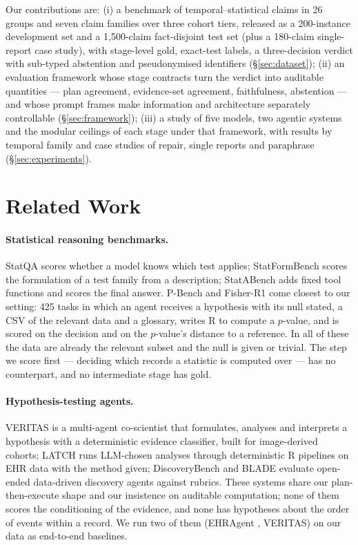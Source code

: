 Our contributions are: (i) a benchmark of temporal--statistical claims in 26
groups and seven claim families over three cohort tiers, released as a
200-instance development set and a 1{,}500-claim fact-disjoint test set (plus
a 180-claim single-report case study), with stage-level gold, exact-test
labels, a three-decision verdict with sub-typed abstention and pseudonymised
identifiers (\S\ref{sec:dataset}); (ii) an evaluation framework whose stage
contracts turn the verdict into auditable quantities --- plan agreement,
evidence-set agreement, faithfulness, abstention --- and whose prompt frames
make information and architecture separately controllable
(\S\ref{sec:framework}); (iii) a study of five models, two agentic systems and
the modular ceilings of each stage under that framework, with results by
temporal family and case studies of repair, single reports and paraphrase
(\S\ref{sec:experiments}).

\section{Related Work}
\label{sec:related}

\paragraph{Statistical reasoning benchmarks.} StatQA \cite{zhu2024statqa}
scores whether a model knows which test applies; StatFormBench
\cite{wang2026statformbench} scores the formulation of a test family from a
description; StatABench \cite{zhu2026statabench} adds fixed tool functions and
scores the final answer. P-Bench and Fisher-R1 \cite{miao2026fisher} come
closest to our setting: 425 tasks in which an agent receives a hypothesis with
its null stated, a CSV of the relevant data and a glossary, writes R to compute
a $p$-value, and is scored on the decision and on the $p$-value's distance to
a reference. In all of these the data are already the relevant subset and the
null is given or trivial. The step we score first --- deciding which records a
statistic is computed over --- has no counterpart, and no intermediate stage
has gold.

\paragraph{Hypothesis-testing agents.} VERITAS \cite{veritas2026} is a
multi-agent co-scientist that formulates, analyses and interprets a hypothesis
with a deterministic evidence classifier, built for image-derived cohorts; LATCH
\cite{gim2026latch} runs LLM-chosen analyses through deterministic R pipelines
on EHR data with the method given; DiscoveryBench and BLADE
\cite{majumder2025discoverybench,gu2024blade} evaluate open-ended data-driven
discovery agents against rubrics. These systems share our plan-then-execute
shape and our insistence on auditable computation; none of them scores the
conditioning of the evidence, and none has hypotheses about the order of
events within a record. We run two of them (EHRAgent \cite{shi2024ehragent},
VERITAS) on our data as end-to-end baselines.


